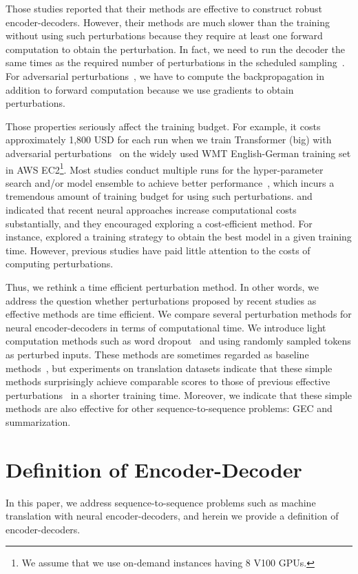 \documentclass[11pt]{article}
\begin{document}
Those studies reported that their methods are effective to construct robust encoder-decoders.
However, their methods are much slower than the training without using such perturbations because they require at least one forward computation to obtain the perturbation.
In fact, we need to run the decoder the same times as the required number of perturbations in the scheduled sampling~\cite{NIPS2015_5956}.
For adversarial perturbations~\cite{sato-etal-2019-effective}, we have to compute the backpropagation in addition to forward computation because we use gradients to obtain perturbations.


Those properties seriously affect the training budget.
For example, it costs approximately 1,800 USD for each run when we train Transformer (big) with adversarial perturbations~\cite{sato-etal-2019-effective} on the widely used WMT English-German training set in AWS EC2\footnote{We assume that we use on-demand instances having 8 V100 GPUs.}.
Most studies conduct multiple runs for the hyper-parameter search and/or model ensemble to achieve better performance~\cite{barrault-etal-2019-findings}, which incurs a tremendous amount of training budget for using such perturbations.
 and  indicated that recent neural approaches increase computational costs substantially, and they encouraged exploring a cost-efficient method.
For instance,  explored a training strategy to obtain the best model in a given training time.
However, previous studies have paid little attention to the costs of computing perturbations.


Thus, we rethink a time efficient perturbation method.
In other words, we address the question whether perturbations proposed by recent studies as effective methods are time efficient.
We compare several perturbation methods for neural encoder-decoders in terms of computational time.
We introduce light computation methods such as word dropout~\cite{NIPS2016_6241} and using randomly sampled tokens as perturbed inputs.
These methods are sometimes regarded as baseline methods~\cite{NIPS2015_5956}, but experiments on translation datasets indicate that these simple methods surprisingly achieve comparable scores to those of previous effective perturbations~\cite{NIPS2015_5956,sato-etal-2019-effective} in a shorter training time.
Moreover, we indicate that these simple methods are also effective for other sequence-to-sequence problems: GEC and summarization.


\section{Definition of Encoder-Decoder}
In this paper, we address sequence-to-sequence problems such as machine translation with neural encoder-decoders, and herein we provide a definition of encoder-decoders.
\end{document}
